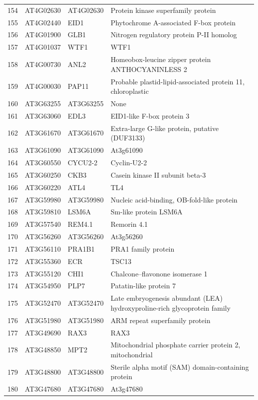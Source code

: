\documentclass[11pt]{article}
\begin{document}
\begin{center}
\begin{tabular}{rlll}
154 & AT4G02630 & AT4G02630 & Protein kinase superfamily protein\\
155 & AT4G02440 & EID1 & Phytochrome A-associated F-box protein\\
156 & AT4G01900 & GLB1 & Nitrogen regulatory protein P-II homolog\\
157 & AT4G01037 & WTF1 & WTF1\\
158 & AT4G00730 & ANL2 & Homeobox-leucine zipper protein ANTHOCYANINLESS 2\\
159 & AT4G00030 & PAP11 & Probable plastid-lipid-associated protein 11, chloroplastic\\
160 & AT3G63255 & AT3G63255 & None\\
161 & AT3G63060 & EDL3 & EID1-like F-box protein 3\\
162 & AT3G61670 & AT3G61670 & Extra-large G-like protein, putative (DUF3133)\\
163 & AT3G61090 & AT3G61090 & At3g61090\\
164 & AT3G60550 & CYCU2-2 & Cyclin-U2-2\\
165 & AT3G60250 & CKB3 & Casein kinase II subunit beta-3\\
166 & AT3G60220 & ATL4 & TL4\\
167 & AT3G59980 & AT3G59980 & Nucleic acid-binding, OB-fold-like protein\\
168 & AT3G59810 & LSM6A & Sm-like protein LSM6A\\
169 & AT3G57540 & REM4.1 & Remorin 4.1\\
170 & AT3G56260 & AT3G56260 & At3g56260\\
171 & AT3G56110 & PRA1B1 & PRA1 family protein\\
172 & AT3G55360 & ECR & TSC13\\
173 & AT3G55120 & CHI1 & Chalcone--flavonone isomerase 1\\
174 & AT3G54950 & PLP7 & Patatin-like protein 7\\
175 & AT3G52470 & AT3G52470 & Late embryogenesis abundant (LEA) hydroxyproline-rich glycoprotein family\\
176 & AT3G51980 & AT3G51980 & ARM repeat superfamily protein\\
177 & AT3G49690 & RAX3 & RAX3\\
178 & AT3G48850 & MPT2 & Mitochondrial phosphate carrier protein 2, mitochondrial\\
179 & AT3G48800 & AT3G48800 & Sterile alpha motif (SAM) domain-containing protein\\
180 & AT3G47680 & AT3G47680 & At3g47680\\

\end{tabular}
\end{center}
\end{document}
